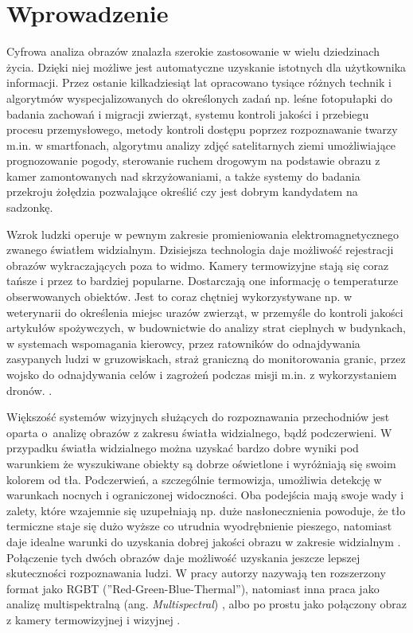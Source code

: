 \chapter{Wprowadzenie}

Cyfrowa analiza obrazów znalazła szerokie zastosowanie w wielu dziedzinach życia. 
Dzięki niej możliwe jest automatyczne uzyskanie istotnych dla użytkownika informacji. 
Przez ostanie kilkadziesiąt lat opracowano tysiące różnych technik i algorytmów wyspecjalizowanych do określonych zadań np. leśne fotopułapki do badania zachowań i migracji zwierząt, systemu kontroli jakości i przebiegu procesu przemysłowego, metody kontroli dostępu poprzez rozpoznawanie twarzy m.in. w smartfonach, algorytmu analizy zdjęć satelitarnych ziemi umożliwiające prognozowanie pogody, sterowanie ruchem drogowym na podstawie obrazu z kamer zamontowanych nad skrzyżowaniami, a także systemy do badania przekroju żołędzia pozwalające określić czy jest dobrym kandydatem na sadzonkę.


Wzrok ludzki operuje w pewnym zakresie promieniowania elektromagnetycznego zwanego światłem widzialnym. 
Dzisiejsza technologia daje możliwość rejestracji obrazów wykraczających poza to widmo. 
Kamery termowizyjne stają się coraz tańsze i przez to bardziej popularne. 
Dostarczają one informację o temperaturze obserwowanych obiektów. 
Jest to coraz chętniej wykorzystywane np. w weterynarii do określenia miejsc urazów zwierząt, w przemyśle do kontroli jakości artykułów spożywczych, w budownictwie do analizy strat cieplnych w budynkach, w systemach wspomagania kierowcy, przez ratowników do odnajdywania zasypanych ludzi w gruzowiskach, straż graniczną do monitorowania granic, przez wojsko do odnajdywania celów i zagrożeń podczas misji m.in. z wykorzystaniem dronów. \cite{gade2014thermal}. 

Większość systemów wizyjnych służących do rozpoznawania przechodniów jest oparta o~analizę obrazów z zakresu światła widzialnego, bądź podczerwieni. 
W przypadku światła widzialnego można uzyskać bardzo dobre wyniki pod warunkiem że wyszukiwane obiekty są dobrze oświetlone i wyróżniają się swoim kolorem od tła. 
Podczerwień, a szczególnie termowizja, umożliwia detekcję w warunkach nocnych i ograniczonej widoczności.
Oba podejścia mają swoje wady i zalety, które wzajemnie się uzupełniają np. duże nasłonecznienia powoduje, że tło termiczne staje się dużo wyższe co utrudnia wyodrębnienie pieszego, natomiast daje idealne warunki do uzyskania dobrej jakości obrazu w zakresie widzialnym \cite{lee2015robust}. 
Połączenie tych dwóch obrazów daje możliwość uzyskania jeszcze lepszej skuteczności rozpoznawania ludzi. 
W pracy \cite{st2007combination} autorzy nazywają ten rozszerzony format jako RGBT (''Red-Green-Blue-Thermal''), natomiast inna praca jako analizę multispektralną (ang. \textit{Multispectral}) \cite{hwang2015multispectral}, albo po prostu jako połączony obraz z kamery termowizyjnej i wizyjnej \cite{lee2015robust}. 

